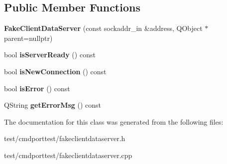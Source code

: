 \subsection*{Public Member Functions}
\begin{DoxyCompactItemize}
\item 
\mbox{\label{classFakeClientDataServer_a01d533cb3a8014bd989fa7e3203f03ff}} 
{\bfseries Fake\+Client\+Data\+Server} (const sockaddr\+\_\+in \&address, Q\+Object $\ast$parent=nullptr)
\item 
\mbox{\label{classFakeClientDataServer_a20c47543d13c0c61a1b3691ae0ff33c9}} 
bool {\bfseries is\+Server\+Ready} () const
\item 
\mbox{\label{classFakeClientDataServer_a2a2e2c68fa2777f08ced465ffe026204}} 
bool {\bfseries is\+New\+Connection} () const
\item 
\mbox{\label{classFakeClientDataServer_af71afc2f04ea532e98c3c155f8efb8d7}} 
bool {\bfseries is\+Error} () const
\item 
\mbox{\label{classFakeClientDataServer_a6fe0e1950db1c0b9a16e1fb1f04c162f}} 
Q\+String {\bfseries get\+Error\+Msg} () const
\end{DoxyCompactItemize}


The documentation for this class was generated from the following files\+:\begin{DoxyCompactItemize}
\item 
test/cmdporttest/fakeclientdataserver.\+h\item 
test/cmdporttest/fakeclientdataserver.\+cpp\end{DoxyCompactItemize}
